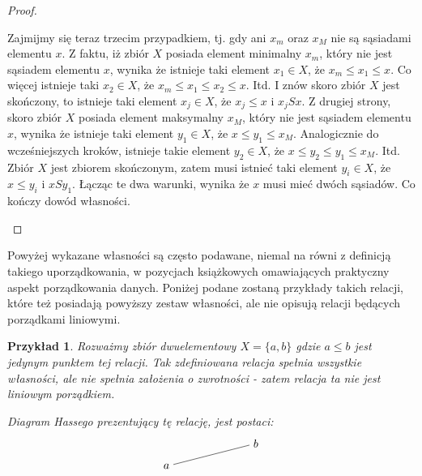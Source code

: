 \documentclass[12pt,a4paper]{report}
\newtheorem{example}{Przykład}
\begin{document}
\begin{proof}
\begin{enumerate}
\begin{itemize}
Zajmijmy się teraz trzecim przypadkiem, tj. gdy ani $x_m$ oraz $x_M$ nie są sąsiadami elementu $x$. Z faktu, iż zbiór $X$ posiada element minimalny $x_m$, który nie jest sąsiadem elementu $x$, wynika że istnieje taki element $x_1 \in X$, że $x_m \leq x_1 \leq x$. Co więcej istnieje taki $x_2 \in X$, że $x_m \leq x_1 \leq x_2 \leq x.$ Itd. I znów skoro zbiór $X$ jest skończony, to istnieje taki element $x_j \in X$, że $x_j \leq x$ i $x_jSx$. Z drugiej strony, skoro zbiór $X$ posiada element maksymalny $x_M$, który nie jest sąsiadem elementu $x$, wynika że istnieje taki element $y_1 \in X$, że $x \leq y_1 \leq x_M$. Analogicznie do wcześniejszych kroków, istnieje takie element $y_2 \in X$, że $x \leq y_2 \leq y_1 \leq x_M$. Itd.  Zbiór $X$ jest zbiorem skończonym, zatem musi istnieć taki element $y_i \in X$, że $x \leq y_i$ i $xSy_1$. 
Łącząc te dwa warunki, wynika że $x$ musi mieć dwóch sąsiadów. Co kończy dowód własności.

\end{itemize}

\end{enumerate}
\end{proof}

Powyżej wykazane własności są często podawane, niemal na równi z definicją takiego uporządkowania, w pozycjach książkowych omawiających praktyczny aspekt porządkowania danych. Poniżej podane zostaną przykłady takich relacji, które też posiadają powyższy zestaw własności, ale nie opisują relacji będących porządkami liniowymi. 
 
\begin{example}
Rozważmy zbiór dwuelementowy $X = \{ a, b \}$ gdzie $a \leq b$ jest jedynym punktem tej relacji. Tak zdefiniowana relacja spełnia wszystkie własności, ale nie spełnia założenia o zwrotności - zatem relacja ta nie jest liniowym porządkiem. 

Diagram Hassego prezentujący tę relację, jest postaci: 
$$
\begin{tikzpicture}[scale=.7]
  \node (a) at (-2,0) {$a$};
  \node (b) at (2,1) {$b$};
  \draw (a)--(b) ; %
\end{tikzpicture}
$$
\end{example}
\end{document}
